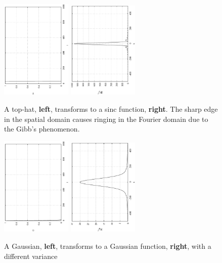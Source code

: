 \documentclass[10pt,a4paper]{article}
\begin{document}
\begin{figure}[h!]
\begin{center}
\includegraphics[width =0.3\textwidth, angle = -90]{tophat.eps}
\includegraphics[width =0.3\textwidth, angle = -90]{tophat_k.eps}
\caption{A top-hat, \textbf{left}, transforms to a sinc function, \textbf{right}. The sharp edge in the spatial domain causes ringing in the Fourier domain due to the Gibb's phenomenon.  }
\label{fig:tophat}
\end{center}
\end{figure}

\begin{figure}[h!]
\begin{center}
\includegraphics[width =0.3\textwidth, angle = -90]{guass.eps}
\includegraphics[width =0.3\textwidth, angle = -90]{guass_k.eps}
\caption{A Gaussian, \textbf{left}, transforms to a Gaussian function, \textbf{right}, with a different variance}
\label{fig:tophat}
\end{center}
\end{figure}
\end{document}
